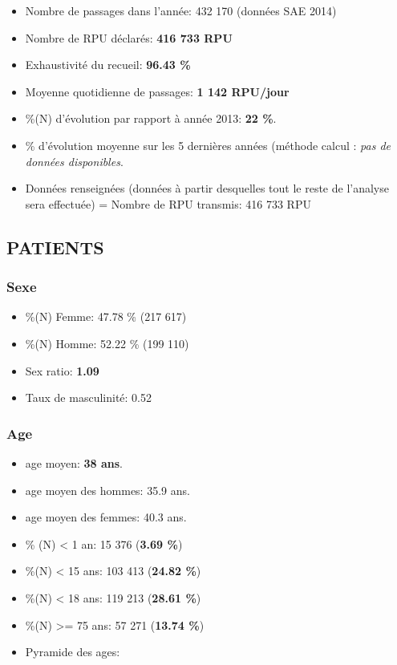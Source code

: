 \documentclass[]{article}
\begin{document}
\begin{itemize}
\itemsep1pt\parskip0pt
\item
  Nombre de passages dans l'année: 432 170 (données SAE 2014)
\item
  Nombre de RPU déclarés: \textbf{416 733 RPU}
\item
  Exhaustivité du recueil: \textbf{96.43 \%}
\item
  Moyenne quotidienne de passages: \textbf{1 142 RPU/jour}
\item
  \%(N) d'évolution par rapport à année 2013: \textbf{22 \%}.
\item
  \% d'évolution moyenne sur les 5 dernières années (méthode calcul :
  \emph{pas de données disponibles}.
\item
  Données renseignées (données à partir desquelles tout le reste de
  l'analyse sera effectuée) = Nombre de RPU transmis: 416 733 RPU
\end{itemize}

\subsection{PATIENTS}\label{patients}

\subsubsection{Sexe}\label{sexe}

\begin{itemize}
\itemsep1pt\parskip0pt
\item
  \%(N) Femme: 47.78 \% (217 617)
\item
  \%(N) Homme: 52.22 \% (199 110)
\item
  Sex ratio: \textbf{1.09}
\item
  Taux de masculinité: 0.52
\end{itemize}

\subsubsection{Age}\label{age}

\begin{itemize}
\item
  age moyen: \textbf{38 ans}.
\item
  age moyen des hommes: 35.9 ans.
\item
  age moyen des femmes: 40.3 ans.
\item
  \% (N) \textless{} 1 an: 15 376 (\textbf{3.69 \%})
\item
  \%(N) \textless{} 15 ans: 103 413 (\textbf{24.82 \%})
\item
  \%(N) \textless{} 18 ans: 119 213 (\textbf{28.61 \%})
\item
  \%(N) \textgreater{}= 75 ans: 57 271 (\textbf{13.74 \%})
\item
  Pyramide des ages:
\end{itemize}
\end{document}
